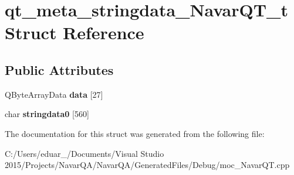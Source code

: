 \hypertarget{structqt__meta__stringdata___navar_q_t__t}{}\section{qt\+\_\+meta\+\_\+stringdata\+\_\+\+Navar\+Q\+T\+\_\+t Struct Reference}
\label{structqt__meta__stringdata___navar_q_t__t}
\subsection*{Public Attributes}
\begin{DoxyCompactItemize}
\item 
Q\+Byte\+Array\+Data {\bfseries data} \mbox{[}27\mbox{]}\hypertarget{structqt__meta__stringdata___navar_q_t__t_a064fea1a0caa2cef65cc1c84352fada2}{}\label{structqt__meta__stringdata___navar_q_t__t_a064fea1a0caa2cef65cc1c84352fada2}

\item 
char {\bfseries stringdata0} \mbox{[}560\mbox{]}\hypertarget{structqt__meta__stringdata___navar_q_t__t_ad8e2a9ea1719500771c4be791ff0fa3c}{}\label{structqt__meta__stringdata___navar_q_t__t_ad8e2a9ea1719500771c4be791ff0fa3c}

\end{DoxyCompactItemize}


The documentation for this struct was generated from the following file\+:\begin{DoxyCompactItemize}
\item 
C\+:/\+Users/eduar\+\_/\+Documents/\+Visual Studio 2015/\+Projects/\+Navar\+Q\+A/\+Navar\+Q\+A/\+Generated\+Files/\+Debug/moc\+\_\+\+Navar\+Q\+T.\+cpp\end{DoxyCompactItemize}

